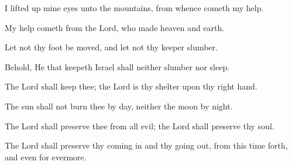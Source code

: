 I lifted up mine eyes unto the mountains, from whence cometh my help.

My help cometh from the Lord, who made heaven and earth.

Let not thy foot be moved, and let not thy keeper slumber.

Behold, He that keepeth Israel shall neither slumber nor sleep.

The Lord shall keep thee; the Lord is thy shelter upon thy right hand.

The sun shall not burn thee by day, neither the moon by night.

The Lord shall preserve thee from all evil; the Lord shall preserve thy soul.

The Lord shall preserve thy coming in and thy going out, from this time forth, and even for evermore.
